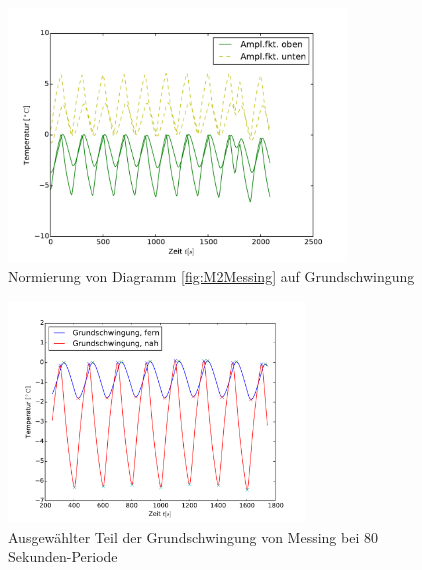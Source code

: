 \begin{figure}[h!]
	\centering
	\includegraphics[width=0.8\textwidth]{Bilder/Normierungsauswahl/M2_Alu_norm.pdf}
	\caption{Normierung von Diagramm \ref{fig:M2Messing} auf Grundschwingung}
	\label{fig:M2MessingNorm}
\end{figure}
\begin{figure}[h!]
	\centering
	\includegraphics[width=0.7\textwidth]{Bilder/M2_Messing_norm.pdf}
	\caption{Ausgewählter Teil der Grundschwingung von Messing bei 80 Sekunden-Periode}
	\label{fig:M2MessingNormkurve}
\end{figure}
